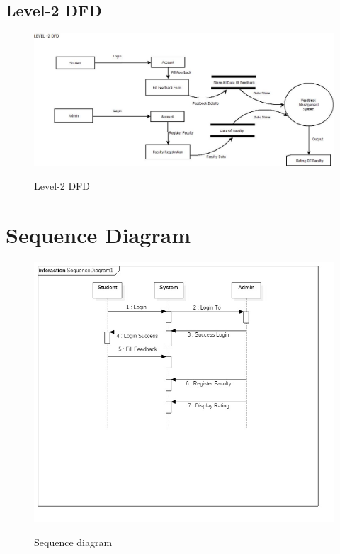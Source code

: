 \documentclass[12 pt,a4paper]{report}
\begin{document}
\subsection{Level-2 DFD }
\begin{figure}[ht]
\begin{center}
\includegraphics[scale=.4]{L-2.png}\\
\caption{Level-2 DFD}
\end{center}
\end{figure}

\newpage
\section{Sequence Diagram}
\begin{figure}[ht]
\begin{center}
\includegraphics[scale=.5]{SequenceDiagram1new.png}\\
\caption{Sequence diagram}
\end{center}
\end{figure}
\newpage
\end{document}
